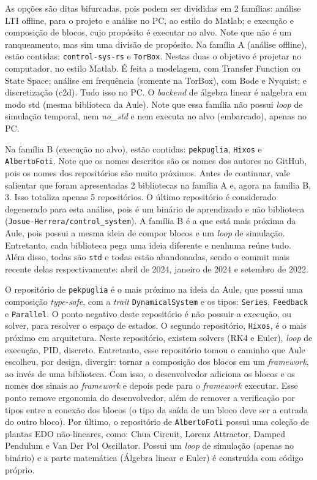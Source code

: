 As opções são ditas bifurcadas, pois podem ser divididas em 2 famílias: análise \ac{LTI} offline, para o projeto e análise no PC, ao estilo do Matlab; e execução e composição de blocos, cujo propósito é executar no alvo. Note que não é um ranqueamento, mas sim uma divisão de propósito. Na família A (análise offline), estão contidas: \texttt{control-sys-rs} e \texttt{TorBox}. Nestas duas o objetivo é projetar no computador, no estilo Matlab. É feita a modelagem, com Transfer Function ou State Space; análise em frequência (somente na TorBox), com Bode e Nyquist; e discretização (c2d). Tudo isso no PC. O \textit{backend} de álgebra linear é nalgebra em modo std (mesma biblioteca da Aule). Note que essa família não possui \textit{loop} de simulação temporal, nem \textit{no\_std} e nem executa no alvo (embarcado), apenas no PC.

Na família B (execução no alvo), estão contidas: \texttt{pekpuglia}, \texttt{Hixos} e \texttt{AlbertoFoti}. Note que os nomes descritos são os nomes dos autores no GitHub, pois os nomes dos repositórios são muito próximos. Antes de continuar, vale salientar que foram apresentadas 2 bibliotecas na família A e, agora na família B, 3. Isso totaliza apenas 5 repositórios. O último repositório é considerado degenerado para esta análise, pois é um binário de aprendizado e não biblioteca (\texttt{Josue-Herrera/control\_system}). A família B é a que está mais próxima da Aule, pois possui a mesma ideia de compor blocos e um \textit{loop} de simulação. Entretanto, cada biblioteca pega uma ideia diferente e nenhuma reúne tudo. Além disso, todas são \texttt{std} e todas estão abandonadas, sendo o commit mais recente delas respectivamente: abril de 2024, janeiro de 2024 e setembro de 2022.

O repositório de \texttt{pekpuglia} é o mais próximo na ideia da Aule, que possui uma composição \textit{type-safe}, com a \textit{trait} \texttt{DynamicalSystem} e os tipos: \texttt{Series}, \texttt{Feedback} e \texttt{Parallel}. O ponto negativo deste repositório é não possuir a execução, ou solver, para resolver o espaço de estados. O segundo repositório, \texttt{Hixos}, é o mais próximo em arquitetura. Neste repositório, existem solvers (\ac{RK4} e Euler), \textit{loop} de execução, \ac{PID}, discreto. Entretanto, esse repositório tomou o caminho que Aule escolheu, por design, divergir: tornar a composição dos blocos em um \textit{framework}, ao invés de uma biblioteca. Com isso, o desenvolvedor adiciona os blocos e os nomes dos sinais ao \textit{framework} e depois pede para o \textit{framework} executar. Esse ponto remove ergonomia do desenvolvedor, além de remover a verificação por tipos entre a conexão dos blocos (o tipo da saída de um bloco deve ser a entrada do outro bloco). Por último, o repositório de \texttt{AlbertoFoti} possui uma coleção de plantas \ac{EDO} não-lineares, como: Chua Circuit, Lorenz Attractor, Damped Pendulum e Van Der Pol Oscillator. Possui um \textit{loop} de simulação (apenas no binário) e a parte matemática (Álgebra linear e Euler) é construída com código próprio.

